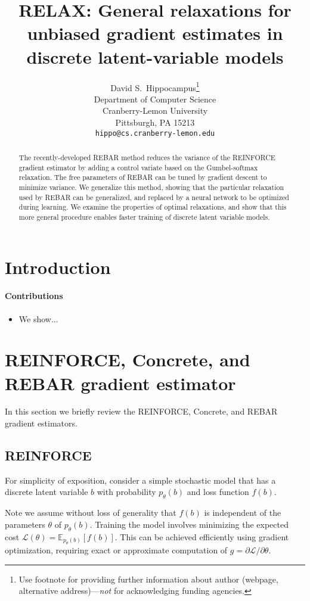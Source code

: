\documentclass{article}
\title{RELAX: General relaxations for unbiased gradient estimates in discrete latent-variable models}
\author{
  David S.~Hippocampus\thanks{Use footnote for providing further
    information about author (webpage, alternative
    address)---\emph{not} for acknowledging funding agencies.} \\
  Department of Computer Science\\
  Cranberry-Lemon University\\
  Pittsburgh, PA 15213 \\
  \texttt{hippo@cs.cranberry-lemon.edu} \\
}
\newcommand{\discreteDist}{p_{\theta}(b)}
\newcommand{\loss}{f(b)}
\newcommand{\expectedLoss}{\mathbb{E}_{\discreteDist{}}[\loss{}]}
\begin{document}
\maketitle
\begin{abstract}
The recently-developed REBAR method reduces the variance of the REINFORCE gradient estimator by adding a control variate based on the Gumbel-softmax relaxation.
The free parameters of REBAR can be tuned by gradient descent to minimize variance.
We generalize this method, showing that the particular relaxation used by REBAR can be generalized, and replaced by a neural network to be optimized during learning.
We examine the properties of optimal relaxations, and show that this more general procedure enables faster training of discrete latent variable models.
\end{abstract}

\section{Introduction}

\paragraph{Contributions}
\begin{itemize}
\item We show...
\end{itemize}

\section{REINFORCE, Concrete, and REBAR gradient estimator}

In this section we briefly review the REINFORCE, Concrete, and REBAR gradient estimators.

\subsection{REINFORCE}

For simplicity of exposition, consider a simple stochastic model that has a discrete latent variable $b$ with probability $\discreteDist{}$ and loss function $\loss{}$.

Note we assume without loss of generality that $\loss{}$ is independent of the parameters  $\theta$ of $\discreteDist{}$.
Training the model involves minimizing the expected cost $\mathcal{L}(\theta)=\expectedLoss{}$.
This can be achieved efficiently using gradient optimization, requiring exact or approximate computation of $g=\partial\mathcal{L} / {\partial \theta}$.
\end{document}
